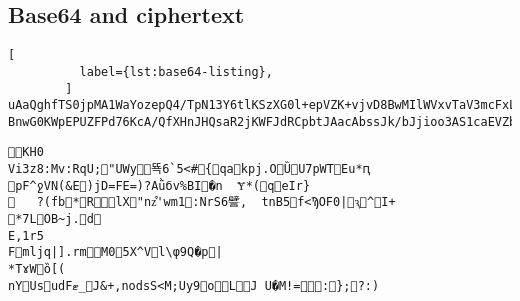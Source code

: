 \begin{figure*}[htbp]
\subsection{Base64 and ciphertext}\label{subsec:base64-and-ciphertext}
        \begin{lstlisting}[
          label={lst:base64-listing},
        ]
uAaQghfTS0jpMA1WaYozepQ4/TpN13Y6tlKSzXG0l+epVZK+vjvD8BwMIlWVxvTaV3mcFxL665qBNsFg//81hpU8I660lq/LAXsPcdfq2vr8YRa14+GH+Gtw6YlqLrDU3E8Rhb/IlAvJ8u5VN8pwV1SmBZLTwL7AyEWlp4GodSrX4NSl5grIFoVwRq7kXofVu1aUToD6KJcmo0X
BnwG0KWpEPUZFPd76KcA/QfXHnJHQsaR2jKWFJdRCpbtJAacAbssJk/bJjioo3AS1caEVZbNJctp9xgqVvgQJPyhmYtMLqdjq/SocUscTrLSPiR2X0g5sWByNIm6ses2SJ3dtMYYeOr7+qtVOcoX+U7w2+uLorawsCcXCmXRunEKd5jXiydwXZjzPoKHaT8hGwDB8CNSHxg/JXrezEJ5JKwq3Gio3xEyjD09Cfq5qLn9kENbcDZ/uRZK6+Swxcqg1DYhGngPJbbPkbOpqcXxdLutybYgdGpFN0zCQw3/LNbxYzOBeVhVsXM+GOVEAcKgYpnyCILwKKtFUyaRX2Q7IjdBbKP8NpG7RWZKFtRBVc4YVdWSIRpfek1/lFkq1JrvgK/6KjyyR+m6sb2RzUzxNO1V5uTkH2m8cBUwQBUqjiNEgVQDzTeaYIZqH0j2Is4cblRcCsjoFgX3Nvh4/OvgpgQ==
        \end{lstlisting}
        \begin{lstlisting}[label={lst:ciphertext.listing}, frame=single]
KH0
Vi3z8:Mv:RqU;"UWy뚁6`5<#{qakpj.OȔU7pWTEu*ԥ
pF^ջVN(&E)jD=FE=)?Aǜбv%BI�n	Ɏ*(qeIr}
	?(fb*RlX"nz͒'wm1:NrS6譬,	tnB5f<ϠOF0|ԇ^I+
*7LOB~j.d
E,1r5
Fmljq|].rmM05X^Vl\φ9Q�p|
*TɤWȍ[(
nYUsudFޓ_J&+,nodsS<M;Uy9oLJ U�M!=:};?:)
        \end{lstlisting}
        \caption{The Base64 encoding and relevant ciphertext after AES-256.}
    \end{figure*}